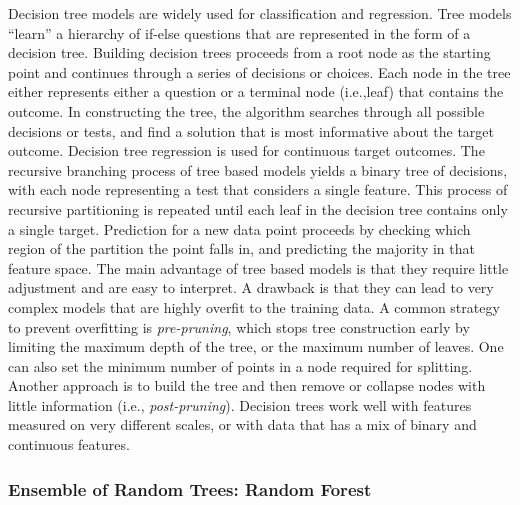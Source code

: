 \documentclass[sigconf]{acmart}
\begin{document}
Decision tree models are widely used for classification and regression. Tree 
models ``learn'' a hierarchy of if-else questions that are represented in the
form of a decision tree. Building decision trees proceeds from a root node as 
the starting point and continues through a series of decisions or choices.
Each node in the tree either represents either a question or a terminal node 
(i.e.,leaf) that contains the outcome. In constructing the tree, the algorithm 
searches through all possible decisions or tests, and find a solution that is 
most informative about the target outcome. Decision tree regression is used 
for continuous target outcomes. The recursive branching process of tree based 
models yields a binary tree of decisions, with each node representing a test 
that considers a single feature. This process of recursive partitioning is 
repeated until each leaf in the decision tree contains only a single target. 
Prediction for a new data point proceeds by checking which region of the 
partition the point falls in, and predicting the majority in that feature space. 
The main advantage of tree based models is that they require little adjustment 
and are easy to interpret. A drawback is that they can lead to very complex
models that are highly overfit to the training data. A common strategy to 
prevent overfitting is \emph{pre-pruning}, which stops tree construction early 
by limiting the maximum depth of the tree, or the maximum number of leaves. 
One can also set the minimum number of points in a node required for splitting.
Another approach is to build the tree and then remove or collapse nodes with 
little information (i.e., \emph{post-pruning}). Decision trees work well with 
features measured on very different scales, or with data that has a mix of 
binary and continuous features. 

\subsubsection{Ensemble of Random Trees: Random Forest}
\end{document}
